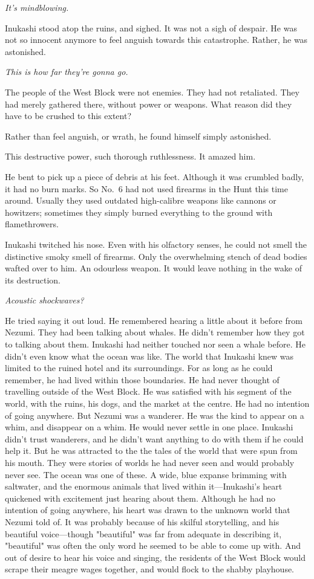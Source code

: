 \emph{It's mindblowing.}

Inukashi stood atop the ruins, and sighed. It was not a sigh of despair.
He was not so innocent anymore to feel anguish towards this catastrophe.
Rather, he was astonished.

\emph{This is how far they're gonna go.}

The people of the West Block were not enemies. They had not retaliated.
They had merely gathered there, without power or weapons. What reason
did they have to be crushed to this extent?

Rather than feel anguish, or wrath, he found himself simply astonished.

This destructive power, such thorough ruthlessness. It amazed him.

He bent to pick up a piece of debris at his feet. Although it was
crumbled badly, it had no burn marks. So No.~6 had not used firearms in
the Hunt this time around. Usually they used outdated high-calibre
weapons like cannons or howitzers; sometimes they simply burned
everything to the ground with flamethrowers.

Inukashi twitched his nose. Even with his olfactory senses, he could not
smell the distinctive smoky smell of firearms. Only the overwhelming
stench of dead bodies wafted over to him. An odourless weapon. It would
leave nothing in the wake of its destruction.

\emph{Acoustic shockwaves?}

He tried saying it out loud. He remembered hearing a little about it
before from Nezumi. They had been talking about whales. He didn't
remember how they got to talking about them. Inukashi had neither
touched nor seen a whale before. He didn't even know what the ocean was
like. The world that Inukashi knew was limited to the ruined hotel and
its surroundings. For as long as he could remember, he had lived within
those boundaries. He had never thought of travelling outside of the West
Block. He was satisfied with his segment of the world, with the ruins,
his dogs, and the market at the centre. He had no intention of going
anywhere. But Nezumi was a wanderer. He was the kind to appear on a
whim, and disappear on a whim. He would never settle in one place.
Inukashi didn't trust wanderers, and he didn't want anything to do with
them if he could help it. But he was attracted to the the tales of the
world that were spun from his mouth. They were stories of worlds he had
never seen and would probably never see. The ocean was one of these. A
wide, blue expanse brimming with saltwater, and the enormous animals
that lived within it---Inukashi's heart quickened with excitement just
hearing about them. Although he had no intention of going anywhere, his
heart was drawn to the unknown world that Nezumi told of. It was
probably because of his skilful storytelling, and his beautiful
voice---though "beautiful" was far from adequate in describing it,
"beautiful" was often the only word he seemed to be able to come up
with. And out of desire to hear his voice and singing, the residents of
the West Block would scrape their meagre wages together, and would flock
to the shabby playhouse.

